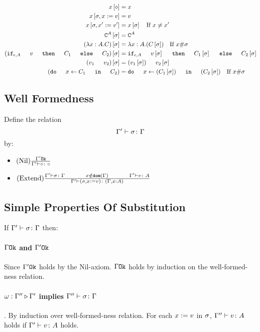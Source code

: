 {        
        \begin{align}
            x\sub{\nil} & = x \\
            x\sub{\si,x\setto v} & = v \\
            x\sub{\si,x'\setto v'} & = x\ssi\quad\text{If }x \neq x'\\
            \const{A}\ssi & = \const{A} \\
            (\lam{x}{A}{C})\ssi &= \lam{x}{A}{(C\ssi)}\quad\text{If }x\#\si\\
            (\ifthenelse{\e}{A}{v}{C_1}{C_2})\ssi &= \ifthenelse{\e}{A}{v\ssi}{C_1\ssi}{C_2\ssi}\\
            (\apply{v_1}{v_2})\ssi&= \apply{(v_1\ssi)}{v_2\ssi}\\
            (\doin{x}{C_1}{C_2})&= \doin{x}{(C_1\ssi)}{(C_2\ssi)}\quad\text{If } x\#\si\\
        \end{align}
    \subsection{Well Formedness}
    Define the relation $$\Gamma' \vdash \sigma \colon \Gamma$$ by:

    \begin{itemize}
        \item $(\text{Nil}) \frac{\Gamma' \texttt{Ok}}{\Gamma' \vdash \diamond \colon \diamond}$
        \item $\treerule{Extend}{
            \typerelation{\G'}{\si}{\G}
            \s\s
            x\notin\dom{\G}
            \s\s
            \typerelation{\G'}{v}{A}
        }{
            \typerelation{\G'}{(\si, x \setto v)}{(\gax)}
        }$
    \end{itemize}
    \subsection{Simple Properties Of Substitution}
    If $\Gamma' \vdash \sigma \colon \Gamma$ then:
    
        \paragraph{$\Gamma \texttt{Ok}$ and $\Gamma' \texttt{Ok}$}
         Since $\Gamma' \texttt{Ok}$ holds by the Nil-axiom. $\Gamma \texttt{Ok}$ holds by induction on the well-formed-ness relation.
        \paragraph{$\omega : \Gamma'' \triangleright \Gamma'$ implies $\Gamma'' \vdash \sigma \colon \Gamma$}. 
        By induction over well-formed-ness relation. For each $x:= v$ in $\sigma$, $\Gamma'' \vdash v \colon A$ holds if $\Gamma' \vdash v \colon A$ holds.
}
